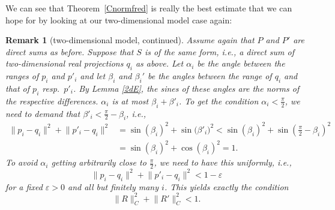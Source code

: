 \documentclass[10pt,a4paper]{amsart}
\numberwithin{equation}{section}
\newtheorem{Remark}[Theorem]{Remark} }
\DeclareMathOperator{\Ran}{Ran}
\begin{document}
		
	We can see that Theorem~\ref{Cnormfred} is really the best estimate that we can hope for by looking at our two-dimensional model case again: %
  \begin{figure}[ht]\centering
	\end{figure}

	\begin{Remark}[two-dimensional model, continued]
	 Assume again that $P$ and $P'$ are direct sums as before. Suppose that $S$ is of the same form, i.e., a direct sum of two-dimensional real projections $q_i$ as above.
	 Let $\alpha_i$ be the angle between the ranges of $p_i$ and $p'_i$ and let $\beta_i$ and $\beta_i'$ be the angles between the range of $q_i$ and that of $p_i$ resp.\ $p'_i$. By Lemma \ref{2dE}, the sines of these angles are the norms of the respective differences. $\alpha_i$ is at most $\beta_i+\beta'_i$. To get the condition $\alpha_i<\frac{\pi}{2}$, we need to demand that $\beta'_i<\frac{\pi}{2}-\beta_i$, i.e.,
\begin{align*}
\|p_i-q_i\|^2+\bigl\|p'_i-q_i\bigr\|^2& =\sin(\beta_i)^2+\sin\bigl(\beta'_i\bigr)^2<\sin(\beta_i)^2+ \sin\left(\frac{\pi}{2}-\beta_i\right)^2\\
& =\sin(\beta_i)^2+\cos(\beta_i)^2=1.
\end{align*}
	To avoid $\alpha_i$ getting arbitrarily close to $\frac{\pi}{2}$, we need to have this uniformly, i.e.,
\[
\|p_i-q_i\|^2+\bigl\|p'_i-q_i\bigr\|^2<1-\varepsilon
\]
for a fixed $\varepsilon>0$ and all but finitely many $i$. This yields exactly the condition
\[
\|R\|_C^2+\bigl\|R'\bigr\|_C^2<1.
\]
	\end{Remark}
\end{document}
